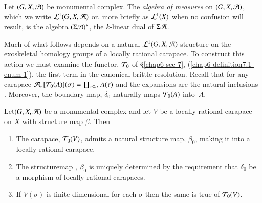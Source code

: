 \setcounter{definition}{3}
\begin{definition}\label{chap6-definition-13.4}
Let $(G, X, \mathcal{A})$ be monumental complex. The \textit{algebra of measures} on $(G, X, \mathcal{A})$, which we write $\mathcal{L}^{1}(G, X, \mathcal{A})$ or, more briefly as $\mathcal{L}^{1}(X)$ when no confusion will result, is the algebra $(\Sigma \mathcal{A})^{*}$, the $k$-linear dual of $\Sigma\mathcal{A}$. 
\end{definition}

 Much of what follows depends on a natural $\mathcal{L}^{1}(G, X, \mathcal{A})$-structure on the exoskeletal homology groups of a locally rational carapace. To construct this action we must examine the functor, $\mathcal{T}_{0}$ of \S \ref{chap6-sec-7},
 (\ref{chap6-definition7.1-enum-1}), the first term in the canonical brittle resolution. Recall that for any carapace $\mathcal{A}, [\mathcal{T}_{0}(A)](\sigma)= \coprod_{\tau \subseteq \sigma}A(\tau)$ and the expansions are the natural inclusions . Moreover, the boundary map, $\delta_{0}$ naturally maps $\mathcal{T}_{0}(A)$ into~$A$.

\begin{secprop}\label{chap6-proposition-13.5}
Let\pageoriginale $(G, X, \mathcal{A})$ be a monumental complex and let $V$ be a locally rational carapace on $X$ with structure map $\beta$. Then
\begin{enumerate}[(1)]
\item The carapace, $\mathcal{T}_{0}(V)$, admits a natural structure map, $\beta_{0}$, making it into a
locally rational carapace.\label{chap6-proposition13.5-enum-1}

\item The structuremap , $\beta_{0}$ is uniquely determined by the requirement that $\delta_{0}$ be a morphism of locally rational carapaces.\label{chap6-proposition13.5-enum-2}

\item If $V(\sigma)$ is finite dimensional for each $\sigma$ then the same is
 true of $\mathcal{T}_{0}(V)$.\label{chap6-proposition13.5-enum-3}
\end{enumerate}
\end{secprop}

